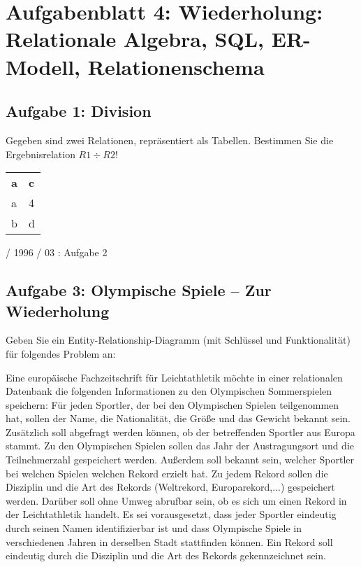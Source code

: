 \documentclass{lehramt-informatik}
\begin{document}
\chapter{Aufgabenblatt 4: Wiederholung: Relationale Algebra, SQL, ER-Modell, Relationenschema}

%

\section{Aufgabe 1: Division}

Gegeben sind zwei Relationen, repräsentiert als Tabellen. Bestimmen Sie
die Ergebnisrelation $R1 \div R2$!

\begin{antwort}
\begin{tabular}{ll}
\textbf{a} & \textbf{c} \\
a & 4 \\
b & d
\end{tabular}
\end{antwort}

%

 / 1996 / 03 : Aufgabe 2

%

\section{Aufgabe 3: Olympische Spiele – Zur Wiederholung}

Geben Sie ein Entity-Relationship-Diagramm (mit Schlüssel und
Funktionalität) für folgendes Problem an:

Eine europäische Fachzeitschrift für Leichtathletik möchte in einer
relationalen Datenbank die folgenden Informationen zu den Olympischen
Sommerspielen speichern: Für jeden Sportler, der bei den Olympischen
Spielen teilgenommen hat, sollen der Name, die Nationalität, die Größe
und das Gewicht bekannt sein. Zusätzlich soll abgefragt werden können,
ob der betreffenden Sportler aus Europa stammt. Zu den Olympischen
Spielen sollen das Jahr der Austragungsort und die Teilnehmerzahl
gespeichert werden. Außerdem soll bekannt sein, welcher Sportler bei
welchen Spielen welchen Rekord erzielt hat. Zu jedem Rekord sollen die
Disziplin und die Art des Rekords (Weltrekord, Europarekord,...)
gespeichert werden. Darüber soll ohne Umweg abrufbar sein, ob es sich um
einen Rekord in der Leichtathletik handelt. Es sei vorausgesetzt, dass
jeder Sportler eindeutig durch seinen Namen identifizierbar ist und dass
Olympische Spiele in verschiedenen Jahren in derselben Stadt stattfinden
können. Ein Rekord soll eindeutig durch die Disziplin und die Art des
Rekords gekennzeichnet sein.
\end{document}
